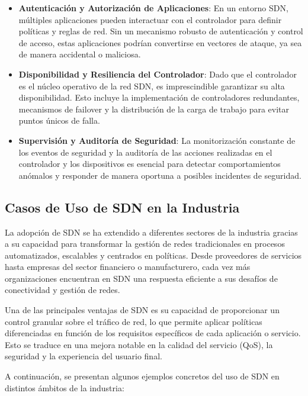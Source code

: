 {\begin{itemize}
                \item \textbf{Autenticación y Autorización de Aplicaciones}: En un entorno SDN, múltiples aplicaciones pueden interactuar con el controlador para definir políticas y reglas de red. Sin un mecanismo robusto de autenticación y control de acceso, estas aplicaciones podrían convertirse en vectores de ataque, ya sea de manera accidental o maliciosa.
            
                \item \textbf{Disponibilidad y Resiliencia del Controlador}: Dado que el controlador es el núcleo operativo de la red SDN, es imprescindible garantizar su alta disponibilidad. Esto incluye la implementación de controladores redundantes, mecanismos de failover y la distribución de la carga de trabajo para evitar puntos únicos de falla.
            
                \item \textbf{Supervisión y Auditoría de Seguridad}: La monitorización constante de los eventos de seguridad y la auditoría de las acciones realizadas en el controlador y los dispositivos es esencial para detectar comportamientos anómalos y responder de manera oportuna a posibles incidentes de seguridad.
            \end{itemize}
            
        \subsection{Casos de Uso de SDN en la Industria}
            La adopción de SDN se ha extendido a diferentes sectores de la industria gracias a su capacidad para transformar la gestión de redes tradicionales en procesos automatizados, escalables y centrados en políticas. Desde proveedores de servicios hasta empresas del sector financiero o manufacturero, cada vez más organizaciones encuentran en SDN una respuesta eficiente a sus desafíos de conectividad y gestión de redes.
                
            Una de las principales ventajas de SDN es su capacidad de proporcionar un control granular sobre el tráfico de red, lo que permite aplicar políticas diferenciadas en función de los requisitos específicos de cada aplicación o servicio. Esto se traduce en una mejora notable en la calidad del servicio (QoS), la seguridad y la experiencia del usuario final.
                
            A continuación, se presentan algunos ejemplos concretos del uso de SDN en distintos ámbitos de la industria:
                
}
